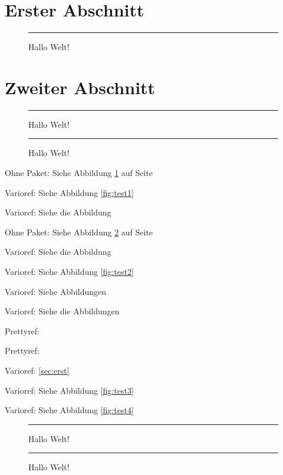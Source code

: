 \documentclass[ngerman]{scrartcl}
\begin{document}
 
\section{Erster Abschnitt}\label{sec:erst}
 
\blindtext[3]
 
\begin{figure}[h]%
\rule{\columnwidth}{5cm}
\caption{Hallo Welt!}%
\label{fig:test1}%
\end{figure}
 
\blindtext[1]
 
\section{Zweiter Abschnitt}
 
\blindtext[1]
 
\begin{figure}[h]%
\rule{\columnwidth}{5cm}
\caption{Hallo Welt!}%
\label{fig:test2}%
\end{figure}
 
\blindtext[1]
 
\begin{figure}%
\rule{\columnwidth}{5cm}
\caption{Hallo Welt!}%
\label{fig:hier}%
\end{figure}
 
\begin{compactitem}
	\item Ohne Paket: Siehe Abbildung \ref{fig:test1} auf Seite \pageref{fig:test1}
	\item Varioref: Siehe Abbildung \vref{fig:test1}
	\item Varioref: Siehe die Abbildung 
	\item Ohne Paket: Siehe Abbildung \ref{fig:test2} auf Seite \pageref{fig:test2} 
	\item Varioref: Siehe die Abbildung 
	\item Varioref: Siehe Abbildung \vref{fig:test2}
	\item Varioref: Siehe Abbildungen 
	\item Varioref: Siehe die Abbildungen 
	\item Prettyref: 
	\item Prettyref: 
	\item Varioref: \vref{sec:erst}
	\item Varioref: Siehe Abbildung \vref{fig:test3}
	\item Varioref: Siehe Abbildung \vref{fig:test4}
\end{compactitem}


 
\clearpage 
 
\begin{figure}%
\rule{\columnwidth}{5cm}
\caption{Hallo Welt!}%
\label{fig:test3}%
\end{figure}
 
\clearpage 
 
\begin{figure}%
\rule{\columnwidth}{5cm}
\caption{Hallo Welt!}%
\label{fig:test4}%
\end{figure}
 
\end{document}
